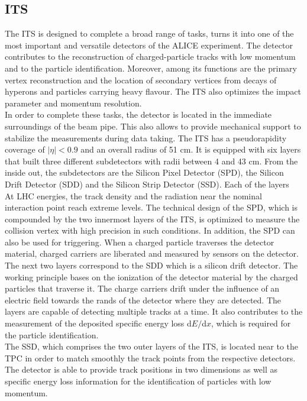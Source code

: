 \documentclass[12pt,a4paper]{report}
\begin{document}
\subsection{ITS}
The ITS is designed to complete a broad range of tasks, turns it into one of the most important and versatile detectors of the ALICE experiment. The detector contributes to the reconstruction of charged-particle tracks with low momentum and to the particle identification. Moreover, among its functions are the primary vertex reconstruction and the location of secondary vertices from decays of hyperons and particles carrying heavy flavour. The ITS also optimizes the impact parameter and momentum resolution. \\
In order to complete these tasks, the detector is located in the immediate surroundings of the beam pipe. This also allows to provide mechanical support to stabilize the measurements during data taking. The ITS has a pseudorapidity coverage of $|\eta| < 0.9 $ and an overall radius of 51 cm. It is equipped with six layers that built three different subdetectors with radii between 4 and 43 cm. From the inside out, the subdetectors are the Silicon Pixel Detector (SPD), the Silicon Drift Detector (SDD) and the Silicon Strip Detector (SSD). Each of the layers \\
At LHC energies, the track density and the radiation near the nominal interaction point reach extreme levels. The technical design of the SPD, which is compounded by the two innermost layers of the ITS, is optimized to measure the collision vertex with high precision in such conditions. In addition, the SPD can also be used for triggering. When a charged particle traverses the detector material, charged carriers are liberated and measured by sensors on the detector. \\
The next two layers correspond to the SDD which is a silicon drift detector. The working principle bases on the ionization of the detector material by the charged particles that traverse it. The charge carriers drift under the influence of an electric field towards the rands of the detector where they are detected. The layers are capable of detecting multiple tracks at a time. It also contributes to the measurement of the deposited specific energy loss d$E/$d$x$, which is required for the particle identification.\\
The SSD, which comprises the two outer layers of the ITS, is located near to the TPC in order to match smoothly the track points from the respective detectors. The detector is able to provide track positions in two dimensions as well as specific energy loss information for the identification of particles with low momentum.\\ 
\end{document}

